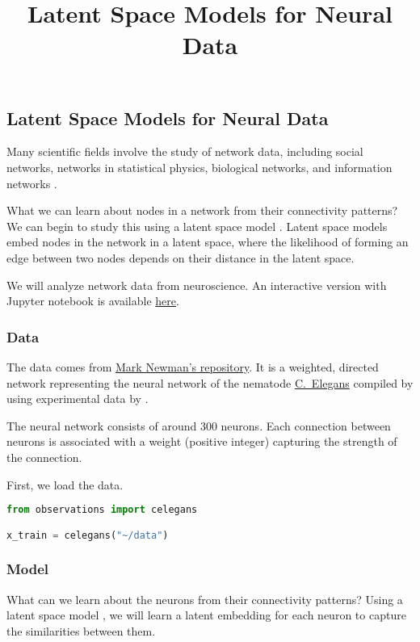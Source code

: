 \title{Latent Space Models for Neural Data}

\subsection{Latent Space Models for Neural Data}

Many scientific fields involve the study of network data, including
social networks, networks in statistical physics, biological
networks, and information networks
\citep{newman2010networks,goldenberg2010survey}.

What we can learn about nodes in a network from their connectivity patterns?
We can begin to study this using a latent space model \citep{hoff2002latent}.
Latent space models embed nodes in the network in a latent space,
where the likelihood of forming an edge between two nodes depends on
their distance in the latent space.

We will analyze network data from neuroscience.
An interactive version with Jupyter notebook is available
\href{http://nbviewer.jupyter.org/github/blei-lab/edward/blob/master/notebooks/latent_space_models.ipynb}{here}.

\subsubsection{Data}

The data comes from \href{http://www-personal.umich.edu/~mejn/netdata/}{Mark Newman's repository}.
It is a weighted, directed network representing the neural network of
the nematode
\href{https://en.wikipedia.org/wiki/Caenorhabditis_elegans}{C.~Elegans}
compiled by \citet{watts1998collective} using experimental data
by \citet{white1986structure}.

The neural network consists of around $300$ neurons. Each connection
between neurons
is associated with a weight (positive integer) capturing the strength
of the connection.

First, we load the data.
\begin{lstlisting}[language=Python]
from observations import celegans

x_train = celegans("~/data")
\end{lstlisting}

\subsubsection{Model}

What can we learn about the neurons from their connectivity patterns? Using
a latent space model \citep{hoff2002latent}, we will learn a latent
embedding for each neuron to capture the similarities between them.

